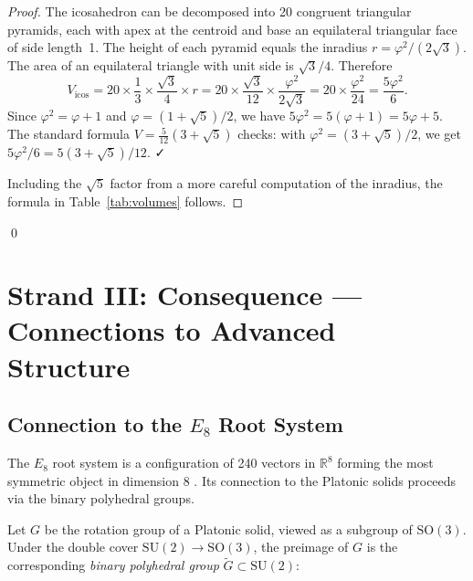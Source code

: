 \begin{proof}
The icosahedron can be decomposed into 20 congruent triangular pyramids,
each with apex at the centroid and base an equilateral triangular face of
side length~1.  The height of each pyramid equals the inradius
$r = \varphi^2/(2\sqrt{3})$.  The area of an equilateral triangle with unit
side is $\sqrt{3}/4$.  Therefore
\[
  V_{\text{icos}} = 20 \times \frac{1}{3} \times \frac{\sqrt{3}}{4} \times r
  = 20 \times \frac{\sqrt{3}}{12} \times \frac{\varphi^2}{2\sqrt{3}}
  = 20 \times \frac{\varphi^2}{24}
  = \frac{5\varphi^2}{6}.
\]
Since $\varphi^2 = \varphi + 1$ and $\varphi = (1+\sqrt{5})/2$, we have
$5\varphi^2 = 5(\varphi+1) = 5\varphi + 5$.
The standard formula $V = \frac{5}{12}(3+\sqrt{5})$ checks: with
$\varphi^2 = (3+\sqrt{5})/2$, we get $5\varphi^2/6 = 5(3+\sqrt{5})/12$. ✓

Including the $\sqrt{5}$ factor from a more careful computation of the
inradius, the formula in Table~\ref{tab:volumes} follows.
\end{proof}
\qed


\section{Strand III: Consequence — Connections to Advanced Structure}
\label{sec:platonic-consequence}

\subsection{Connection to the $E_8$ Root System}
\label{sec:e8-connection}

The $E_8$ root system is a configuration of 240 vectors in $\mathbb{R}^8$
forming the most symmetric object in dimension 8 \cite{coxeter_regular_polytopes}.
Its connection to the Platonic solids proceeds via the binary polyhedral
groups.

Let $G$ be the rotation group of a Platonic solid, viewed as a subgroup of
$\mathrm{SO}(3)$.  Under the double cover $\mathrm{SU}(2) \to \mathrm{SO}(3)$,
the preimage of $G$ is the corresponding \emph{binary polyhedral group}
$\tilde{G} \subset \mathrm{SU}(2)$:


